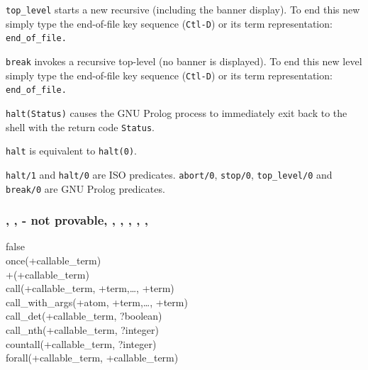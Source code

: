 \texttt{top\_level} starts a new recursive  (including the
banner display). To end this new  simply type the end-of-file
key sequence (\texttt{Ctl-D}) or its term representation:
\texttt{end\_of\_file.}

\texttt{break} invokes a recursive top-level (no banner is displayed). To
end this new level simply type the end-of-file key sequence (\texttt{Ctl-D})
or its term representation: \texttt{end\_of\_file.}

\texttt{halt(Status)} causes the GNU Prolog process to immediately exit back to
the shell with the return code \texttt{Status}.

\texttt{halt} is equivalent to \texttt{halt(0)}.

\begin{PlErrors}



\end{PlErrors}

\Portability

\texttt{halt/1} and \texttt{halt/0} are ISO predicates. \texttt{abort/0},
\texttt{stop/0}, \texttt{top\_level/0} and \texttt{break/0} are GNU Prolog
predicates.

\subsubsection{, ,  - not provable,
               ,
               , , , , }

\begin{TemplatesOneCol}
false\\
once(+callable\_term)\\
{\bs}+(+callable\_term) \\
call(+callable\_term, +term,\ldots, +term)\\
call\_with\_args(+atom, +term,\ldots, +term)\\
call\_det(+callable\_term, ?boolean) \\
call\_nth(+callable\_term, ?integer) \\
countall(+callable\_term, ?integer) \\
forall(+callable\_term, +callable\_term)

\end{TemplatesOneCol}

